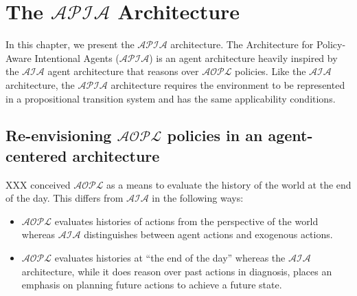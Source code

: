 \chapter{The $\mathcal{APIA}$ Architecture}

%
%
%
%
%
%

In this chapter, we present the $\mathcal{APIA}$ architecture.
The Architecture for Policy-Aware Intentional Agents ($\mathcal{APIA}$) is an agent architecture heavily inspired by the $\mathcal{AIA}$ agent architecture that reasons over $\mathcal{AOPL}$ policies.
Like the $\mathcal{AIA}$ architecture, the $\mathcal{APIA}$ architecture requires the environment to be represented in a propositional transition system and has the same applicability conditions.

\section{Re-envisioning $\mathcal{AOPL}$ policies in an agent-centered architecture}

XXX conceived $\mathcal{AOPL}$ as a means to evaluate the history of the world at the end of the day.
This differs from $\mathcal{AIA}$ in the following ways:

\begin{itemize}
    \item $\mathcal{AOPL}$ evaluates histories of actions from the perspective of the world whereas $\mathcal{AIA}$ distinguishes between agent actions and exogenous actions.
    \item $\mathcal{AOPL}$ evaluates histories at ``the end of the day'' whereas the $\mathcal{AIA}$ architecture, while it does reason over past actions in diagnosis, places an emphasis on planning future actions to achieve a future state.
\end{itemize}

